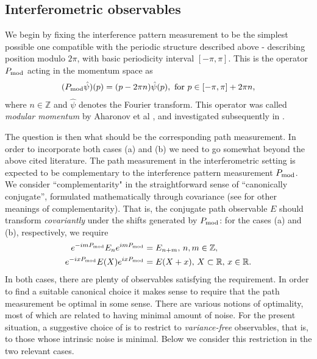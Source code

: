 \subsection{Interferometric observables}

We begin by fixing the interference pattern measurement to be the simplest possible one compatible with the periodic structure described above - describing position modulo $2\pi$, with basic periodicity interval $[-\pi,\pi]$. This is the operator $P_{\mathrm{mod}}$ acting in the momentum space as
\begin{align}
(P_{\mathrm{mod}}\hat\psi)(p) = (p-2\pi n)\hat\psi(p), \text{ for } p\in [-\pi,\pi] +2\pi n,
\end{align}
where $n\in \mathbb Z$ and $\hat \psi$ denotes the Fourier transform. This operator was called \emph{modular momentum} by Aharonov et al \cite{aharonov-modular-variables}, and investigated subsequently in \cite{PhysRevA.90.022115}.

The question is then what should be the corresponding path measurement. In order to incorporate both cases (a) and (b) we need to go somewhat beyond the above cited literature. The path measurement in the interferometric setting is expected to be complementary to the interference pattern measurement $P_{\mathrm{mod}}$. We consider ``complementarity" in the straightforward sense of ``canonically conjugate'', formulated mathematically through covariance (see \cite{} for other meanings of complementarity). That is, the conjugate path observable $E$ should transform \emph{covariantly} under the shifts generated by $P_{\mathrm{mod}}$: for the cases (a) and (b), respectively, we require
\begin{align}
e^{-im P_{\mathrm{mod}}}E_ne^{im P_{\mathrm{mod}}} &= E_{n+m}, \,n,m\in \mathbb Z, \label{covA}\\
e^{-ix P_{\mathrm{mod}}}E(X)e^{ix P_{\mathrm{mod}}} &= E(X+x), \,X\subset \mathbb R,\,x\in \mathbb R. \label{covB}
\end{align}
In both cases, there are plenty of observables satisfying the requirement. In order to find a suitable canonical choice it makes sense to require that the path measurement be optimal in some sense. There are various notions of optimality, most of which are related to having minimal amount of noise. For the present situation, a suggestive choice of is to restrict to \emph{variance-free} observables, that is, to those whose intrinsic noise is minimal. Below we consider this restriction in the two relevant cases.

